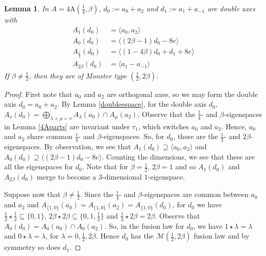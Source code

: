 \documentclass[11pt, a4paper]{article}
\theoremstyle{plain}
\newtheorem{lemma}[theorem]{Lemma}
\theoremstyle{definition}
\newcommand\bt{\beta}
\newcommand\cM{\mathcal{M}}
\newcommand\la{\langle}
\newcommand\ra{\rangle}
\newcommand{\A}{\mathrm{A}}
\newcommand{\0}{\overline{0}}
\newcommand{\2}{\overline{2}}
\newcommand{\1}{\mathbbm{1}}
\begin{document}
\begin{lemma}\label{4Adouble}
In $A = 4\A(\frac{1}{4}, \bt)$, $d_0 := a_0+a_2$ and $d_1 := a_1+a_{-1}$ are double axes with
\begin{align*}
A_1(d_0) &= \la a_0, a_2 \ra \\
A_0(d_0) &= \la (2\bt-1)d_0 -8e \ra \\
A_{\frac{1}{2}}(d_0) &= \la (1-4\bt)d_0 + d_1 + 8e \ra \\
A_{2\bt}(d_0) &= \la a_1 - a_{-1} \ra
\end{align*}
If $\bt \neq \frac{1}{2}$, then they are of Monster type $(\frac{1}{2}, 2\beta)$.
\end{lemma}
\begin{proof}
First note that $a_0$ and $a_2$ are orthogonal axes, so we may form the double axis $d_0 = a_0+a_2$.  By Lemma \ref{doubleespace}, for the double axis $d_0$, $A_\nu(d_0) = \bigoplus_{\lambda + \mu = \nu} A_\lambda(a_0) \cap A_\mu(a_2)$.  Observe that the $\frac{1}{4}$- and $\bt$-eigenspaces in Lemma \ref{4Aparts} are invariant under $\tau_1$, which switches $a_0$ and $a_2$.  Hence, $a_0$ and $a_2$ share common $\frac{1}{4}$- and $\bt$-eigenspaces.  So, for $d_0$, these are the $\frac{1}{2}$- and $2\bt$-eigenspaces.  By observation, we see that $A_1(d_0) \supseteq \la a_0, a_2 \ra$ and $A_0(d_0) \supseteq \la (2\bt-1)d_0 -8e \ra$.  Counting the dimensions, we see that these are all the eigenspaces for $d_0$.  Note that for $\bt = \frac{1}{2}$, $2\bt = 1$ and so $A_1(d_0)$ and $A_{2\bt}(d_0)$ merge to become a $3$-dimensional $1$-eigenspace.

Suppose now that $\bt \neq \frac{1}{2}$.  Since the $\frac{1}{4}$- and $\bt$-eigenspaces are common between $a_0$ and $a_2$ and $A_{\{1,0\}}(a_0) = A_{\{1,0\}}(a_2) = A_{\{1,0\}}(d_0)$, for $d_0$ we have $\frac{1}{2} \star \frac{1}{2} \subseteq \{0,1\}$, $2\bt \star 2\bt \subseteq \{0,1,\frac{1}{2}\}$ and $\frac{1}{2} \star 2\bt = 2\bt$.  Observe that $A_0(d_0) = A_0(a_0) \cap A_0(a_2)$.  So, in the fusion law for $d_0$, we have $1 \star \lambda = \lambda$ and $0 \star \lambda = \lambda$, for $\lambda = 0, \frac{1}{2}, 2\bt$.  Hence $d_0$ has the  $\cM(\frac{1}{2}, 2\bt)$ fusion law and by symmetry so does $d_1$.
\end{proof}
\end{document}
